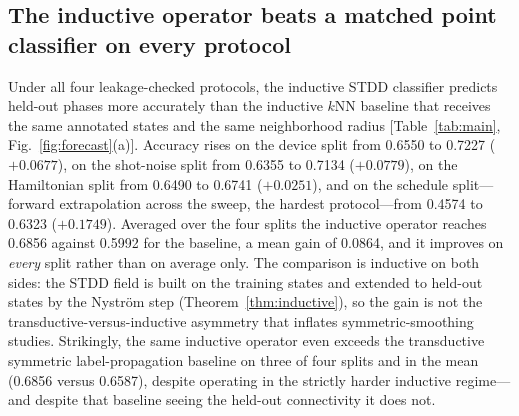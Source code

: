 \documentclass[aps,prresearch,reprint,amsmath,amssymb,nofootinbib,superscriptaddress,floatfix]{revtex4-2}
\theoremstyle{definition}
\theoremstyle{remark}
\theoremstyle{plain}
\begin{document}
\subsection{The inductive operator beats a matched point classifier on every protocol}
Under all four leakage-checked protocols, the inductive STDD classifier predicts held-out phases more
accurately than the inductive $k$NN baseline that receives the same annotated states and the same
neighborhood radius [Table~\ref{tab:main}, Fig.~\ref{fig:forecast}(a)]. Accuracy rises on the device split
from \num{0.6550} to \num{0.7227} ($+\num{0.0677}$), on the shot-noise split from \num{0.6355} to
\num{0.7134} ($+\num{0.0779}$), on the Hamiltonian split from \num{0.6490} to \num{0.6741}
($+\num{0.0251}$), and on the schedule split---forward extrapolation across the sweep, the hardest
protocol---from \num{0.4574} to \num{0.6323} ($+\num{0.1749}$). Averaged over the four splits the inductive
operator reaches \num{0.6856} against \num{0.5992} for the baseline, a mean gain of \num{0.0864}, and it
improves on \emph{every} split rather than on average only. The comparison is inductive on both sides: the
STDD field is built on the training states and extended to held-out states by the Nystr\"om step
(Theorem~\ref{thm:inductive}), so the gain is not the transductive-versus-inductive asymmetry that inflates
symmetric-smoothing studies. Strikingly, the same inductive operator even exceeds the transductive
symmetric label-propagation baseline on three of four splits and in the mean (\num{0.6856} versus
\num{0.6587}), despite operating in the strictly harder inductive regime---and despite that baseline seeing
the held-out connectivity it does not.
\end{document}
